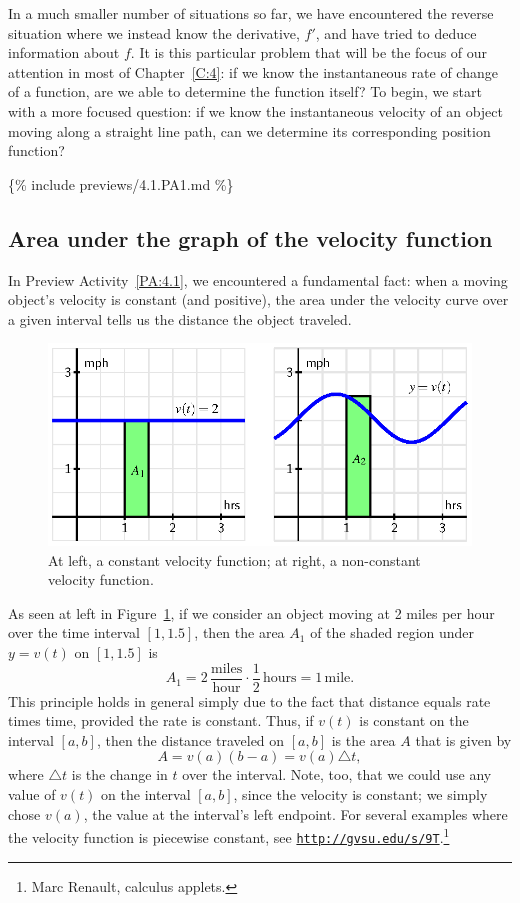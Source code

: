 In a much smaller number of situations so far, we have encountered the reverse situation where we instead know the derivative, $f'$, and have tried to deduce information about $f$.  It is this particular problem that will be the focus of our attention in most of Chapter~\ref{C:4}: if we know the instantaneous rate of change of a function, are we able to determine the function itself?  To begin, we start with a more focused question:  if we know the instantaneous velocity of an object moving along a straight line path, can we determine its corresponding position function? 

\{\% include previews/4.1.PA1.md \%\}

\subsection*{Area under the graph of the velocity function}

In Preview Activity~\ref{PA:4.1}, we encountered a fundamental fact:  when a moving object's velocity is constant (and positive), the area under the velocity curve over a given interval tells us the distance the object traveled.   
\begin{figure}[h]
\begin{center}
\includegraphics{figures/4_1_VelArea.eps}
\caption{At left, a constant velocity function; at right, a non-constant velocity function.} \label{F:4.1.VelArea}
\end{center}
\end{figure}
As seen at left in Figure~\ref{F:4.1.VelArea}, if we consider an object moving at 2 miles per hour over the time interval $[1,1.5]$, then the area $A_1$ of the shaded region under $y = v(t)$ on $[1,1.5]$ is
$$A _1= 2 \, \frac{\mbox{miles}}{\mbox{hour}} \cdot \frac{1}{2} \, \mbox{hours} = 1 \, \mbox{mile}.$$
This principle holds in general simply due to the fact that distance equals rate times time, provided the rate is constant.  Thus, if $v(t)$ is constant on the interval $[a,b]$, then the distance traveled on $[a,b]$ is the area $A$ that is given by 
$$A = v(a) (b-a) = v(a) \triangle t,$$
where $\triangle t$ is the change in $t$ over the interval.  Note, too, that we could use any value of $v(t)$ on the interval $[a,b]$, since the velocity is constant; we simply chose $v(a)$, the value at the interval's left endpoint.  For several examples where the velocity function is piecewise constant, see \href{http://gvsu.edu/s/9T}{\texttt{http://gvsu.edu/s/9T}}.\footnote{Marc Renault, calculus applets.}	

